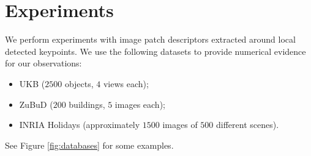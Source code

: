 \documentclass[twocolumn]{article}
\begin{document}
	\section{Experiments}
		We perform experiments with image patch descriptors extracted around local detected keypoints.
		We use the following datasets to provide numerical evidence for our observations:
		\begin{itemize}
			\item
				UKB \cite{ukb} ($2500$ objects, $4$ views each);
			\item
				ZuBuD \cite{zubud} ($200$ buildings, $5$ images each);
			\item
				INRIA Holidays \cite{holidays}
				(approximately $1500$ images of $500$ different scenes).
		\end{itemize}
		See Figure \ref{fig:databases} for some examples.
\end{document}
